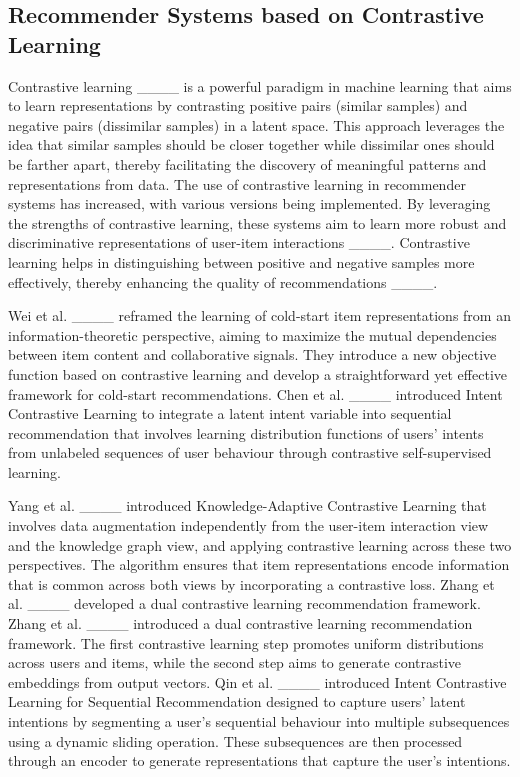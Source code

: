 \subsection{Recommender Systems based on Contrastive Learning}

    Contrastive learning ____ is a powerful paradigm in machine learning that aims to learn representations by contrasting positive pairs (similar samples) and negative pairs (dissimilar samples) in a latent space. This approach leverages the idea that similar samples should be closer together while dissimilar ones should be farther apart, thereby facilitating the discovery of meaningful patterns and representations from data. The use of contrastive learning in recommender systems has increased, with various versions being implemented. By leveraging the strengths of contrastive learning, these systems aim to learn more robust and discriminative representations of user-item interactions ____.  Contrastive learning helps in distinguishing between positive and negative samples more effectively, thereby enhancing the quality of recommendations ____.
    
    Wei et al. ____  reframed the learning of cold-start item representations from an information-theoretic perspective, aiming to maximize the mutual dependencies between item content and collaborative signals. They introduce a new objective function based on contrastive learning and develop a straightforward yet effective framework for cold-start recommendations. Chen et al. ____ introduced Intent Contrastive Learning to  integrate a latent intent variable into sequential recommendation that involves learning distribution functions of users' intents from unlabeled sequences of user behaviour through contrastive self-supervised learning.
    
    Yang et al. ____ introduced Knowledge-Adaptive Contrastive Learning that involves  data augmentation independently from the user-item interaction view and the knowledge graph  view, and applying contrastive learning across these two perspectives. The algorithm ensures that item representations encode information that is common across both views by incorporating a contrastive loss. Zhang et al. ____ developed a dual contrastive learning recommendation framework. Zhang et al. ____ introduced a dual contrastive learning recommendation framework. The first contrastive learning step promotes uniform distributions across users and items, while the second step aims to generate contrastive embeddings from output vectors. Qin et al. ____ introduced Intent Contrastive Learning  for Sequential Recommendation designed to capture users' latent intentions by segmenting a user's sequential behaviour into multiple subsequences using a dynamic sliding operation. These subsequences are then processed through an encoder to generate representations that capture the user's intentions.
    
